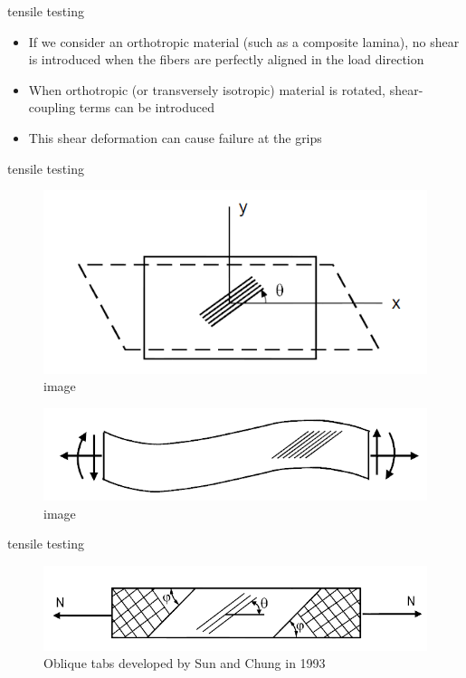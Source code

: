 \documentclass[
  letterpaper,
  ignorenonframetext,
  aspectratio=43,
  handout,
  12pt]{beamer}
\providecommand{\tightlist}{%
  \setlength{\itemsep}{0pt}\setlength{\parskip}{0pt}}
\providecommand{\tightlist}{%
\setlength{\itemsep}{0pt}\setlength{\parskip}{0pt}}
\let\Oldincludegraphics\includegraphics
\renewcommand{\includegraphics}[2][]{\Oldincludegraphics[width=\textwidth,height=0.7\textheight,keepaspectratio]{#2}}
\begin{document}
\begin{frame}{tensile testing}
\protect\hypertarget{tensile-testing}{}
\begin{itemize}
\tightlist
\item
  If we consider an orthotropic material (such as a composite lamina),
  no shear is introduced when the fibers are perfectly aligned in the
  load direction
\item
  When orthotropic (or transversely isotropic) material is rotated,
  shear-coupling terms can be introduced
\item
  This shear deformation can cause failure at the grips
\end{itemize}
\end{frame}

\begin{frame}{tensile testing}
\protect\hypertarget{tensile-testing-1}{}
\begin{figure}
\centering
\includegraphics{../images/fiber_shear.PNG}
\caption{image}
\end{figure}

\begin{figure}
\centering
\includegraphics{../images/fiber_warp.PNG}
\caption{image}
\end{figure}
\end{frame}

\begin{frame}{tensile testing}
\protect\hypertarget{tensile-testing-2}{}
\begin{figure}
\centering
\includegraphics{../images/oblique_tabs.PNG}
\caption{Oblique tabs developed by Sun and Chung in 1993}
\end{figure}
\end{frame}
\end{document}
